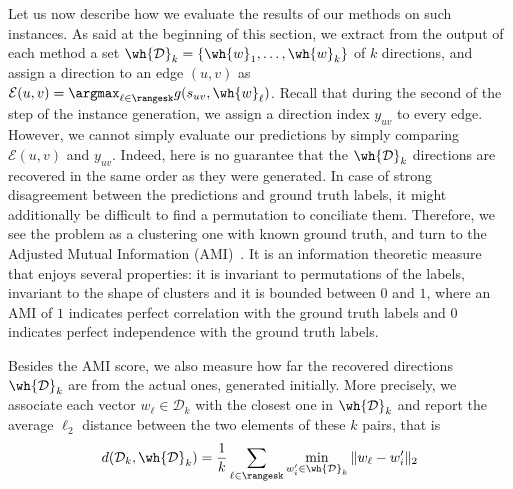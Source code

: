 Let us now describe how we evaluate the results of our methods on such instances. As said at the
beginning of this section, we extract from the output of each method a set $\mathcal{\wh{D}}_k =
\{\wh{w}_1, \ldots, \wh{w}_k\}$ of $k$ directions, and assign a 
direction to an edge $(u,v)$ as $\mathcal{E}(u,v) = \argmax_{\ell \in \rangesk} g(s_{uv}, \wh{w}_\ell)$.
Recall that during the second of the step of the instance generation, we assign a direction index
$y_{uv}$ to every edge.
However, we cannot simply evaluate our predictions by simply comparing $\mathcal{E}(u,v)$ and
$y_{uv}$. Indeed, here is no guarantee that the $\mathcal{\wh{D}}_k$
directions are recovered in the same order as they were generated. In case of strong disagreement
between the predictions and ground truth labels, it might additionally be difficult to find a
permutation to conciliate them.  Therefore, we see the problem as a clustering one with known ground
truth, and turn to the Adjusted Mutual Information (AMI)~\autocite{AMI09}. It is an information
theoretic measure that enjoys several properties: it is invariant to permutations of the labels,
invariant to the shape of clusters and it is bounded between $0$ and $1$, where an AMI of $1$
indicates perfect correlation with the ground truth labels and $0$ indicates perfect independence
with the ground truth labels.

Besides the AMI score, we also measure how far the recovered directions $\mathcal{\wh{D}}_k$
are from the actual ones, generated initially. More precisely, we associate each vector $w_\ell \in
\mathcal{D}_k$ with the closest one in $\mathcal{\wh{D}}_k$ and report the average $\ell_2$ distance
between the two elements of these $k$ pairs, that is
\begin{equation*}
  d(\mathcal{D}_k, \mathcal{\wh{D}}_k) =
  \frac{1}{k} \sum_{\ell \in \rangesk} \min_{w'_i \in \mathcal{\wh{D}}_k} \| w_\ell - w'_i \|_2
\end{equation*}

\medskip

